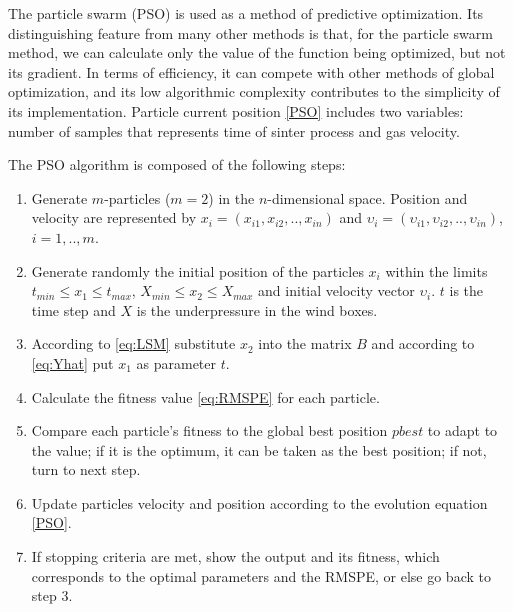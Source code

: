 \documentclass[AMS,STIX2COL]{WileyNJD-v2}
\begin{document}
The particle swarm (PSO) is used as a method of predictive optimization. Its distinguishing feature from many other methods is that, for the particle swarm method, we can calculate only the value of the function being optimized, but not its gradient. In terms of efficiency, it can compete with other methods of global optimization, and its low algorithmic complexity contributes to the simplicity of its implementation. 
Particle current position \eqref{PSO} includes two variables: number of samples that represents time of sinter process and gas velocity.

The PSO algorithm is composed of the following steps:
\begin{enumerate}
	\item Generate $m$-particles ($m=2$) in the $n$-dimensional space. Position and velocity are represented by $x_i=(x_{i1},x_{i2},..,x_{in})$ and $\upsilon_i = (\upsilon_{i1},\upsilon_{i2},..,\upsilon_{in})$, $i=1,..,m$.
	\item Generate randomly the initial position of the particles $x_i$ within the limits $t_{min} \leqslant x_1 \leqslant t_{max}$, $X_{min} \leqslant x_2 \leqslant X_{max}$ and initial velocity vector $\upsilon_{i}$. $t$ is the time step and $X$  is the underpressure in the wind boxes.
	\item According to \eqref{eq:LSM} substitute $x_2$ into the matrix $B$ and according to \eqref{eq:Yhat} put $x_1$ as parameter $t$.
	\item Calculate the fitness value \eqref{eq:RMSPE} for each particle.
	\item Compare each particle’s fitness to the global best position $pbest$ to adapt to the value; if it is the optimum, it can be taken as the best position; if not, turn to next step.
	\item Update particles velocity and position according to the evolution equation \eqref{PSO}.
	\item If stopping criteria are met, show the output and its fitness, which corresponds to the optimal parameters and the RMSPE, or else go back to step 3.
\end{enumerate}
\end{document}
